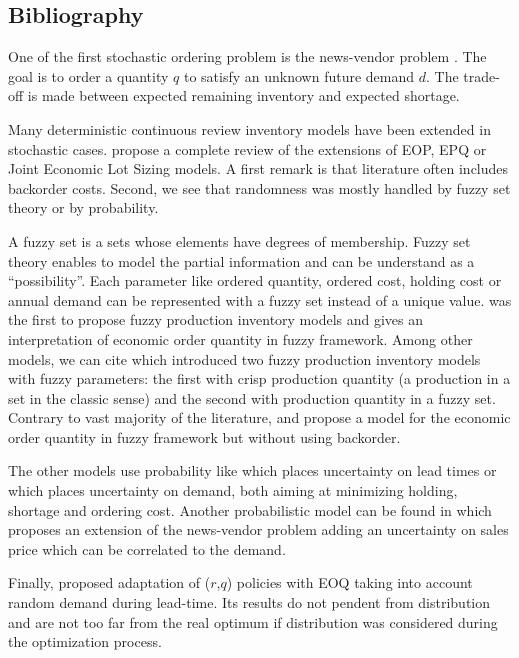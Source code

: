 \subsection{Bibliography}


One of the first stochastic ordering problem is the news-vendor problem \cite{Edgeworth88,Arrow1951}.
The goal is to order a quantity $q$ to satisfy an unknown future demand $d$.
The trade-off is made between expected remaining inventory and expected shortage.


Many deterministic continuous review inventory models have been extended in stochastic cases.
\cite{Ziukov2015} propose a complete review of the extensions of EOP, EPQ or Joint Economic Lot Sizing models.
A first remark is that literature often includes backorder costs.
Second, we see that randomness was mostly handled by fuzzy set theory or by probability.


\medskip


A fuzzy set is a sets whose elements have degrees of membership.
Fuzzy set theory enables to model the partial information and can be understand as a ``possibility''.
Each parameter like ordered quantity, ordered cost, holding cost or annual demand can be represented with a fuzzy set instead of a unique value.
\cite{Park1987} was the first to propose fuzzy production inventory models and gives an interpretation of economic order quantity in fuzzy framework.
Among other models, we can cite \cite{Hsieh2002} which introduced two fuzzy production inventory models with fuzzy parameters: the first with crisp production quantity (\ie a production in a set in the classic sense) and the second with production quantity in a fuzzy set.
Contrary to vast majority of the literature, \cite{Lee1999} and \cite{Wang2007} propose a model for the economic order quantity in fuzzy framework but without using backorder.



The other models use probability like \cite{Friedman1984} which places uncertainty on lead times or \cite{Eynan2007} which places uncertainty on demand, both aiming at minimizing holding, shortage and ordering cost.
Another probabilistic model can be found in \cite{Sana2011} which proposes an extension of the news-vendor problem adding an uncertainty on sales price which can be correlated to the demand.


Finally, \cite{Gallego1998} proposed adaptation of ($r$,$q$) policies with EOQ taking into account random demand during lead-time.
Its results do not pendent from distribution and are not too far from the real optimum if distribution was considered during the optimization process.


